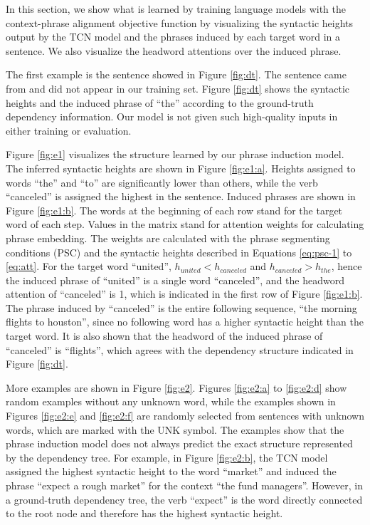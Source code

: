 \documentclass[11pt,a4paper]{article}
\begin{document}
In this section, we show what is learned by training language models with the context-phrase alignment objective function by visualizing the syntactic heights output by the TCN model and the phrases induced by each target word in a sentence. We also visualize the headword attentions over the induced phrase.

The first example is the sentence showed in Figure \ref{fig:dt}. The sentence came from \citet{jurafsky2014speech} and did not appear in our training set.  Figure \ref{fig:dt} shows the syntactic heights and the induced phrase of ``the'' according to the ground-truth dependency information. Our model is not given such high-quality inputs in either training or evaluation.



Figure \ref{fig:e1} visualizes the structure learned by our phrase induction model. The inferred syntactic heights are shown in Figure \ref{fig:e1:a}. Heights assigned to words ``the'' and ``to'' are significantly lower than others, while the verb ``canceled'' is assigned the highest in the sentence. Induced phrases are shown in Figure \ref{fig:e1:b}. The words at the beginning of each row stand for the target word of each step. Values in the matrix stand for attention weights for calculating phrase embedding. The weights are calculated with the phrase segmenting conditions (PSC) and the syntactic heights described in Equations \ref{eq:psc-1} to \ref{eq:att}. For the target word ``united'', $h_{united} < h_{canceled}$ and $h_{canceled} > h_{the}$, hence the induced phrase of ``united'' is a single word ``canceled'', and the headword attention of ``canceled'' is 1, which is indicated in the first row of Figure \ref{fig:e1:b}. The phrase induced by ``canceled'' is the entire following sequence, ``the morning flights to houston'', since no following word has a higher syntactic height than the target word. It is also shown that the headword of the induced phrase of ``canceled'' is ``flights'', which agrees with the dependency structure indicated in Figure \ref{fig:dt}.

More examples are shown in Figure \ref{fig:e2}. Figures \ref{fig:e2:a} to \ref{fig:e2:d} show random examples without any unknown word, while the examples shown in Figures \ref{fig:e2:e} and \ref{fig:e2:f} are randomly selected from sentences with unknown words, which are marked with the UNK symbol. The examples show that the phrase induction model does not always predict the exact structure represented by the dependency tree. For example, in Figure \ref{fig:e2:b}, the TCN model assigned the highest syntactic height to the word ``market'' and induced the phrase ``expect a rough market'' for the context ``the fund managers''. However, in a ground-truth dependency tree, the verb ``expect'' is the word directly connected to the root node and therefore has the highest syntactic height.
\end{document}
